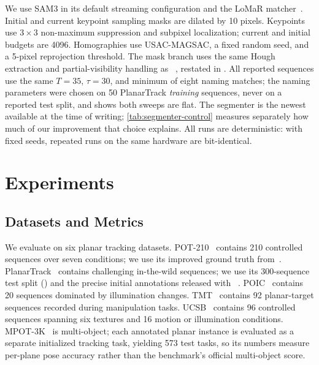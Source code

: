 \documentclass[10pt,twocolumn,letterpaper]{article}
\begin{document}
We use SAM3 in its default streaming configuration and the LoMaR matcher~\cite{nordstrom2026handles}.
Initial and current keypoint sampling masks are dilated by 10 pixels.
Keypoints use $3\times3$ non-maximum suppression and subpixel localization; current and initial budgets are 4096.
Homographies use USAC-MAGSAC, a fixed random seed, and a 5-pixel reprojection threshold.
The mask branch uses the same Hough extraction and partial-visibility handling as \samh~\cite{serych2026woftsam}, restated in .
All reported sequences use the same $T=35$, $\tau=30$, and minimum of eight naming matches; the naming parameters were chosen on 50 PlanarTrack \emph{training} sequences, never on a reported test split, and  shows both sweeps are flat.
The segmenter is the newest available at the time of writing; \cref{tab:segmenter-control} measures separately how much of our improvement that choice explains.
All runs are deterministic: with fixed seeds, repeated runs on the same hardware are bit-identical.
\section{Experiments}
\label{sec:experiments}

\subsection{Datasets and Metrics}
\label{sec:datasets-metrics}

We evaluate on six planar tracking datasets.
POT-210~\cite{liang2017planar} contains 210 controlled sequences over seven conditions; we use its improved ground truth from~\cite{serych2023planar}.
PlanarTrack~\cite{liu2023planartrack} contains challenging in-the-wild sequences; we use its 300-sequence test split (\pttst) and the precise initial annotations released with \woftsam~\cite{serych2026woftsam}.
POIC~\cite{alismail2016robust} contains 20 sequences dominated by illumination changes.
TMT~\cite{roy2015tracking} contains 92 planar-target sequences recorded during manipulation tasks.
UCSB~\cite{gauglitz2011evaluation} contains 96 controlled sequences spanning six textures and 16 motion or illumination conditions.
MPOT-3K~\cite{zhang2023multiple} is multi-object; each annotated planar instance is evaluated as a separate initialized tracking task, yielding 573 test tasks, so its numbers measure per-plane pose accuracy rather than the benchmark's official multi-object score.
\end{document}
